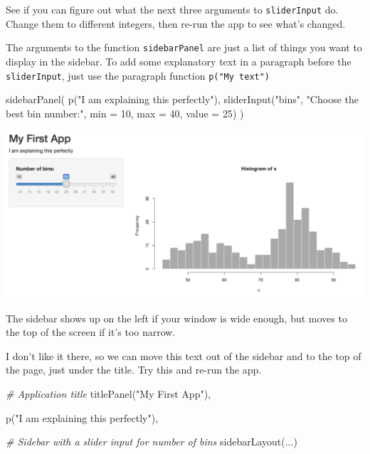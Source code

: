 \documentclass[
]{book}
\newenvironment{Shaded}{\begin{snugshade}}{\end{snugshade}}
\newcommand{\AttributeTok}[1]{\textcolor[rgb]{0.77,0.63,0.00}{#1}}
\newcommand{\CommentTok}[1]{\textcolor[rgb]{0.56,0.35,0.01}{\textit{#1}}}
\newcommand{\DecValTok}[1]{\textcolor[rgb]{0.00,0.00,0.81}{#1}}
\newcommand{\FunctionTok}[1]{\textcolor[rgb]{0.00,0.00,0.00}{#1}}
\newcommand{\NormalTok}[1]{#1}
\newcommand{\StringTok}[1]{\textcolor[rgb]{0.31,0.60,0.02}{#1}}
\begin{document}
See if you can figure out what the next three arguments to \texttt{sliderInput} do. Change them to different integers, then re-run the app to see what's changed.

The arguments to the function \texttt{sidebarPanel} are just a list of things you want to display in the sidebar. To add some explanatory text in a paragraph before the \texttt{sliderInput}, just use the paragraph function \texttt{p("My\ text")}

\begin{Shaded}
\begin{Highlighting}[]
      \FunctionTok{sidebarPanel}\NormalTok{(}
         \FunctionTok{p}\NormalTok{(}\StringTok{"I am explaining this perfectly"}\NormalTok{),}
         \FunctionTok{sliderInput}\NormalTok{(}\StringTok{"bins"}\NormalTok{,}
                     \StringTok{"Choose the best bin number:"}\NormalTok{,}
                     \AttributeTok{min =} \DecValTok{10}\NormalTok{,}
                     \AttributeTok{max =} \DecValTok{40}\NormalTok{,}
                     \AttributeTok{value =} \DecValTok{25}\NormalTok{)}
\NormalTok{      )}
\end{Highlighting}
\end{Shaded}

\includegraphics{images/demo_app/07-app-sidebar-p.png}

The sidebar shows up on the left if your window is wide enough, but moves to the top of the screen if it's too narrow.

I don't like it there, so we can move this text out of the sidebar and to the top of the page, just under the title. Try this and re-run the app.

\begin{Shaded}
\begin{Highlighting}[]
   \CommentTok{\# Application title}
   \FunctionTok{titlePanel}\NormalTok{(}\StringTok{"My First App"}\NormalTok{),}

   \FunctionTok{p}\NormalTok{(}\StringTok{"I am explaining this perfectly"}\NormalTok{),}

   \CommentTok{\# Sidebar with a slider input for number of bins}
   \FunctionTok{sidebarLayout}\NormalTok{(...)}
\end{Highlighting}
\end{Shaded}
\end{document}
